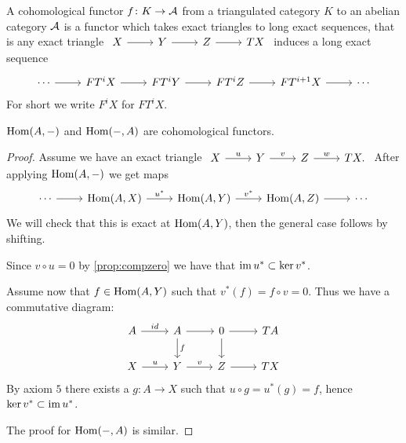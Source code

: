 \documentclass[a4paper, UKenglish]{report}
\begin{document}
\begin{definition}
    A cohomological functor $f \colon K \to \mathcal{A}$ from a triangulated category $K$ to an abelian category $\mathcal{A}$ is a functor which takes exact triangles to long exact sequences, that is any exact triangle $\begin{tikzcd} X \ar[r] & Y \ar[r] & Z \ar[r] & TX \end{tikzcd}$ induces a long exact sequence
    \[ 
        \begin{tikzcd}
            \cdots \ar[r] & FT^iX \ar[r] & FT^iY \ar[r] & FT^iZ \ar[r] & FT^{i+1}X \ar[r] & \cdots 
        \end{tikzcd}    
    \]
    For short we write $F^iX$ for $FT^iX$.
\end{definition}

\begin{lemma}
    $\operatorname{Hom}(A,-)$ and $\operatorname{Hom}(-,A)$ are cohomological functors.
\end{lemma}

\begin{proof}
    Assume we have an exact triangle $\begin{tikzcd} X \ar[r, "u"] & Y \ar[r, "v"] & Z \ar[r, "w"] & TX. \end{tikzcd}$ After applying $\operatorname{Hom}(A,-)$ we get maps
    \[ 
        \begin{tikzcd}    
            \cdots \ar[r] & \Hom(A,X) \ar[r, "u^\ast"] & \Hom(A,Y) \ar[r, "v^\ast"] & \Hom(A,Z) \ar[r] & \cdots 
        \end{tikzcd}
    \]
    We will check that this is exact at $\operatorname{Hom}(A,Y)$, then the general case follows by shifting.

Since $v \circ u = 0$ by \cref{prop:compzero} we have that $\operatorname{im} u^\ast \subset \ker v^\ast$.

Assume now that $f \in \operatorname{Hom}(A,Y)$ such that $v^\ast(f) = f \circ v = 0$. Thus we have a commutative diagram:
    \[
        \begin{tikzcd}
            A  \ar{r}{id} & A \ar{d}{f} \ar{r} & 0 \arrow{d} \ar{r} &  TA \\
            X \ar{r}{u} & Y \ar{r}{v} & Z \ar{r} & TX 
        \end{tikzcd} 
    \]
    By axiom $5$ there exists a $g \colon A \to X$ such that $u \circ g = u^\ast (g) = f$, hence $\ker v^\ast \subset \operatorname{im} u^\ast$.

    The proof for $\operatorname{Hom}(-,A)$ is similar.
\end{proof}

\clearpage
\printbibliography
\end{document}
